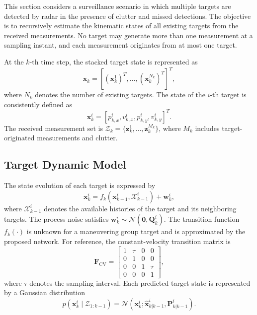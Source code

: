 \documentclass[10pt,doublecolumn]{IEEEtaes}
\begin{document}
This section considers a surveillance scenario in which multiple targets are detected by radar in the presence of clutter and missed detections. The objective is to recursively estimate the kinematic states of all existing targets from the received measurements. No target may generate more than one measurement at a sampling instant, and each measurement originates from at most one target.

At the $k$-th time step, the stacked target state is represented as
\begin{equation}
\mathbf{x}_{k}=\left[\left(\mathbf{x}_{k}^{1}\right)^{T},\ldots,\left(\mathbf{x}_{k}^{N_k}\right)^{T}\right]^{T},
\end{equation}
where $N_k$ denotes the number of existing targets. The state of the $i$-th target is consistently defined as
\begin{equation}
\mathbf{x}_{k}^{i}=\left[p_{k,x}^{i},v_{k,x}^{i},p_{k,y}^{i},v_{k,y}^{i}\right]^{T}.
\label{eq:state_definition}
\end{equation}
The received measurement set is $\mathcal{Z}_k=\{\mathbf{z}_{k}^{1},\ldots,\mathbf{z}_{k}^{M_k}\}$, where $M_k$ includes target-originated measurements and clutter.

\subsection{Target Dynamic Model}

The state evolution of each target is expressed by
\begin{equation}
\mathbf{x}_{k}^{i}=f_k\!\left(\mathbf{x}_{k-1}^{i},\mathcal{X}_{k-1}^{i}\right)+\mathbf{w}_{k}^{i},
\label{eq:general_dynamics}
\end{equation}
where $\mathcal{X}_{k-1}^{i}$ denotes the available histories of the target and its neighboring targets. The process noise satisfies $\mathbf{w}_{k}^{i}\sim\mathcal{N}(\mathbf{0},\mathbf{Q}_{k}^{i})$. The transition function $f_k(\cdot)$ is unknown for a maneuvering group target and is approximated by the proposed network. For reference, the constant-velocity transition matrix is
\begin{equation}
\mathbf{F}_{\mathrm{CV}}=
\begin{bmatrix}
1&\tau&0&0\\
0&1&0&0\\
0&0&1&\tau\\
0&0&0&1
\end{bmatrix},
\label{eq:cv_transition}
\end{equation}
where $\tau$ denotes the sampling interval. Each predicted target state is represented by a Gaussian distribution
\begin{equation}
p(\mathbf{x}_{k}^{i}\mid\mathcal{Z}_{1:k-1})=
\mathcal{N}\!\left(\mathbf{x}_{k}^{i};\hat{\mathbf{x}}_{k|k-1}^{i},\mathbf{P}_{k|k-1}^{i}\right).
\end{equation}
\end{document}
